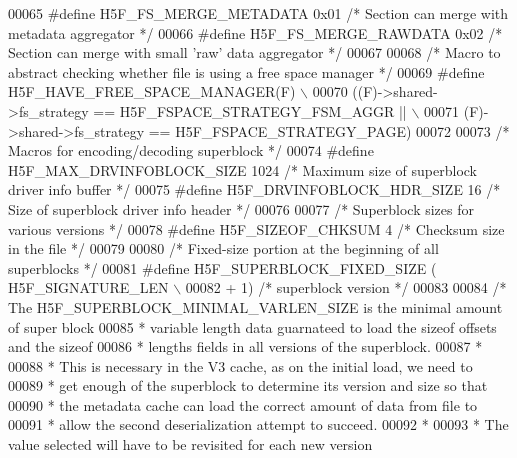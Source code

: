 \begin{DoxyCode}
00065 \textcolor{preprocessor}{#define H5F\_FS\_MERGE\_METADATA           0x01    }\textcolor{comment}{/* Section can merge with metadata aggregator */}\textcolor{preprocessor}{}
00066 \textcolor{preprocessor}{#define H5F\_FS\_MERGE\_RAWDATA            0x02    }\textcolor{comment}{/* Section can merge with small 'raw' data aggregator */}\textcolor{preprocessor}{}
00067 
00068 \textcolor{comment}{/* Macro to abstract checking whether file is using a free space manager */}
00069 \textcolor{preprocessor}{#define H5F\_HAVE\_FREE\_SPACE\_MANAGER(F)  \(\backslash\)}
00070 \textcolor{preprocessor}{    ((F)->shared->fs\_strategy == H5F\_FSPACE\_STRATEGY\_FSM\_AGGR ||                        \(\backslash\)}
00071 \textcolor{preprocessor}{     (F)->shared->fs\_strategy == H5F\_FSPACE\_STRATEGY\_PAGE)}
00072 
00073 \textcolor{comment}{/* Macros for encoding/decoding superblock */}
00074 \textcolor{preprocessor}{#define H5F\_MAX\_DRVINFOBLOCK\_SIZE  1024         }\textcolor{comment}{/* Maximum size of superblock driver info buffer */}\textcolor{preprocessor}{}
00075 \textcolor{preprocessor}{#define H5F\_DRVINFOBLOCK\_HDR\_SIZE 16            }\textcolor{comment}{/* Size of superblock driver info header */}\textcolor{preprocessor}{}
00076 
00077 \textcolor{comment}{/* Superblock sizes for various versions */}
00078 \textcolor{preprocessor}{#define H5F\_SIZEOF\_CHKSUM 4     }\textcolor{comment}{/* Checksum size in the file */}\textcolor{preprocessor}{}
00079 
00080 \textcolor{comment}{/* Fixed-size portion at the beginning of all superblocks */}
00081 \textcolor{preprocessor}{#define H5F\_SUPERBLOCK\_FIXED\_SIZE ( H5F\_SIGNATURE\_LEN                   \(\backslash\)}
00082 \textcolor{preprocessor}{        + 1) }\textcolor{comment}{/* superblock version */}\textcolor{preprocessor}{}
00083 
00084 \textcolor{comment}{/* The H5F\_SUPERBLOCK\_MINIMAL\_VARLEN\_SIZE is the minimal amount of super block}
00085 \textcolor{comment}{ * variable length data guarnateed to load the sizeof offsets and the sizeof }
00086 \textcolor{comment}{ * lengths fields in all versions of the superblock.}
00087 \textcolor{comment}{ *}
00088 \textcolor{comment}{ * This is necessary in the V3 cache, as on the initial load, we need to }
00089 \textcolor{comment}{ * get enough of the superblock to determine its version and size so that}
00090 \textcolor{comment}{ * the metadata cache can load the correct amount of data from file to }
00091 \textcolor{comment}{ * allow the second deserialization attempt to succeed.}
00092 \textcolor{comment}{ *}
00093 \textcolor{comment}{ * The value selected will have to be revisited for each new version }

\end{DoxyCode}
